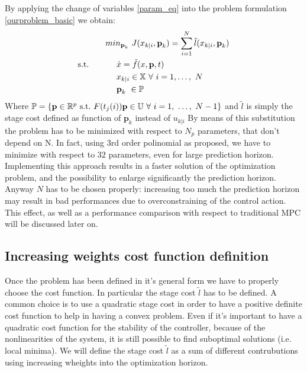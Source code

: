 By applying the change of variables \ref{param_eq} into the problem formulation \ref{ourproblem_basic} we obtain:
\begin{equation} \label{ourproblem_param}
\begin{split}
		& min_{\textbf{p}_k}\ J({x}_{k|i},\textbf{p}_k) = \sum_{i=1}^{N}\tilde{l}({x}_{k|i},\textbf{p}_k) \\
		\textnormal{s.t.}\qquad
		&\ \ \ \ \dot{{x}}=\tilde{f}({x},\textbf{p},t) \\
		&\ \ \ \ {x}_{k|i} \in \mathbb{X}\ \forall\ i=1,\dots,\ N  \\
		&\ \ \ \ \textbf{p}_k\   \in \mathbb{P}\ \\
	\end{split}	
\end{equation}
Where $\mathbb{P} = \lbrace \textbf{p}\in \mathbb{R}^p\ \textnormal{s.t.}\ F(t_j(i))\textbf{p} \in \mathbb{U}\ \forall\ i = 1,\ \dots,\ N-1 \rbrace $ and $\tilde{l}$ is simply the stage cost defined as function of $\textbf{p}_k$ instead of ${u}_{k|i}$ By means of this substitution the problem has to be minimized with respect to $N_p$ parameters, that don't depend on N. In fact, using 3rd order polinomial as proposed, we have to minimize with respect to $32$ parameters, even for large prediction horizon. Implementing this approach results in a faster solution of the optimization problem, and the possibility to enlarge significantly the prediction horizon. Anyway $N$ has to be chosen properly: increasing too much the prediction horizon may result in bad performances due to overconstraining of the control action. This effect, as well as a performance comparison with respect to traditional MPC will be discussed later on.

\subsection{Increasing weights cost function definition}

Once the problem has been defined in it's general form we have to properly choose the cost function. In particular the stage cost $\tilde{l}$ has to be defined. A common choice is to use a quadratic stage cost in order to have a positive definite cost function to help in having a convex problem. Even if it's important to have a quadratic cost function for the stability of the controller, because of the nonlinearities of the system, it is still possible to find suboptimal solutions (i.e. local minima). We will define the stage cost $\tilde{l}$ as a sum of different contrubutions using increasing wheights into the optimization horizon. 

